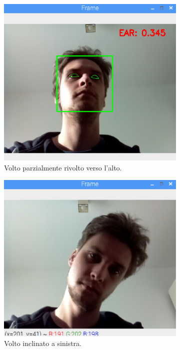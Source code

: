 \documentclass[12pt]{article}
\begin{document}
\begin{figure}[!htb]
\begin{subfigure}{.3\textwidth}
		\includegraphics[width=.8\linewidth]{eps/mp_upward_view.eps}
		\caption{Volto parzialmente rivolto verso l'alto.}
	\end{subfigure}
	\par\bigskip %
	\begin{subfigure}{.3\textwidth}
		\centering
		\includegraphics[width=.8\linewidth]{eps/mp_left_tilted_view.eps}
		\caption{Volto inclinato a sinistra.}
	\end{subfigure}
	\hspace{5mm}
	\begin{subfigure}{.3\textwidth}
		\centering

\end{subfigure}
\end{figure}
\end{document}
